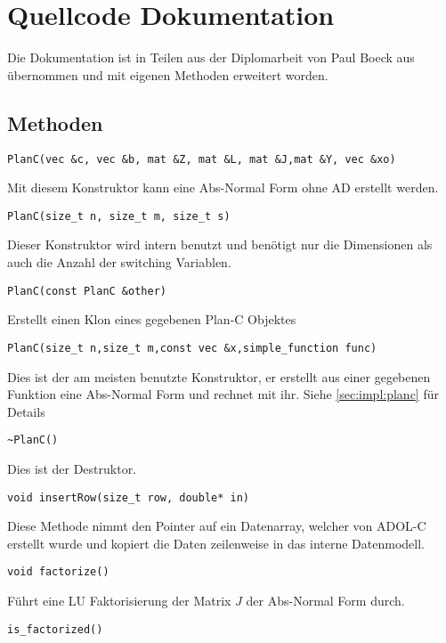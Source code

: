 \chapter{Quellcode Dokumentation}\label{sec:source}
Die Dokumentation ist in Teilen aus der Diplomarbeit von Paul Boeck aus \cite{boeck14} übernommen und mit eigenen Methoden erweitert worden.
\section[Public Methoden]{\texorpdfstring{}{Public} Methoden}
\lstset{
		aboveskip=0pt,
		belowskip=0pt,
		columns=flexible,
	}
\begin{lstlisting}[numbers=none]
PlanC(vec &c, vec &b, mat &Z, mat &L, mat &J,mat &Y, vec &xo)
\end{lstlisting}
Mit diesem Konstruktor kann eine Abs-Normal Form ohne AD erstellt werden.
\begin{lstlisting}[numbers=none]
PlanC(size_t n, size_t m, size_t s)
\end{lstlisting}
Dieser Konstruktor wird intern benutzt und benötigt nur die Dimensionen als auch die Anzahl der switching Variablen.
\begin{lstlisting}[numbers=none]
PlanC(const PlanC &other)
\end{lstlisting}
Erstellt einen Klon eines gegebenen Plan-C Objektes
\begin{lstlisting}[numbers=none]
PlanC(size_t n,size_t m,const vec &x,simple_function func)
\end{lstlisting}
Dies ist der am meisten benutzte Konstruktor, er erstellt aus einer gegebenen Funktion eine Abs-Normal Form und rechnet mit ihr. Siehe \ref{sec:impl:planc} für Details
\begin{lstlisting}[numbers=none]
~PlanC()
\end{lstlisting}
Dies ist der Destruktor.
\begin{lstlisting}[numbers=none]
void insertRow(size_t row, double* in)
\end{lstlisting}
Diese Methode nimmt den Pointer auf ein Datenarray, welcher von ADOL-C erstellt wurde und kopiert die Daten zeilenweise in das interne Datenmodell.
\begin{lstlisting}[numbers=none]
void factorize()
\end{lstlisting}
Führt eine LU Faktorisierung der Matrix $J$ der Abs-Normal Form durch.
\begin{lstlisting}[numbers=none]
is_factorized()
\end{lstlisting}
